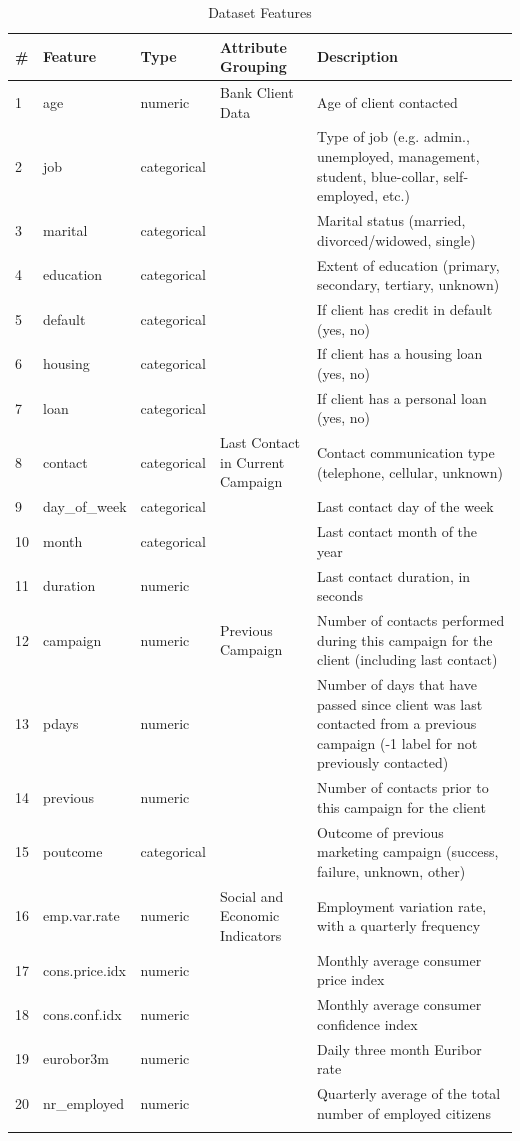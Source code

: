 \documentclass[11pt]{article}
\begin{document}
\begin{longtable}[hbt!]
{p{}p{}p{}p{}p{}}%
\caption{Dataset Features}\\
\hline
\textbf{\#}& \textbf{Feature}& \textbf{Type}& \textbf{Attribute Grouping}& \textbf{Description}\\
\hline
1&age&numeric&Bank Client Data&Age of client contacted\\
2&job &categorical& &Type of job (e.g. admin., unemployed, management, student, blue-collar, self-employed, etc.) \\
3&marital &categorical& &Marital status (married, divorced/widowed, single) \\
4&education &categorical& &Extent of education (primary, secondary, tertiary, unknown)  \\
5&default   &categorical& &If client has credit in default (yes, no) \\
6&housing &categorical& &If client has a housing loan (yes, no)\\
7&loan&categorical& &If client has a personal loan (yes, no) \\
8&contact &categorical&Last Contact in Current Campaign &Contact communication type (telephone, cellular, unknown)\\
9&day\_of\_week  &categorical& &Last contact day of the week\\
10&month   &categorical& &Last contact month of the year \\
11&duration &numeric& &Last contact duration, in seconds \\
12&campaign  &numeric&Previous Campaign &Number of contacts performed during this campaign for the client (including last contact) \\
13&pdays &numeric& &Number of days that have passed since client was last contacted from a previous campaign (-1 label for not previously contacted)\\
14&previous  &numeric& &Number of contacts prior to this campaign for the client \\
15&poutcome &categorical & &Outcome of previous marketing campaign (success, failure, unknown, other) \\
16&emp.var.rate &numeric &Social and Economic Indicators &Employment variation rate, with a quarterly frequency  \\
17&cons.price.idx  &numeric & &Monthly average consumer price index  \\
18&cons.conf.idx &numeric & &Monthly average consumer confidence index \\
19&eurobor3m  &numeric & &Daily three month Euribor rate  \\
20&nr\_employed   &numeric & &Quarterly average of the total number of employed citizens   \\
\label{tB}

\end{longtable}
\end{document}
